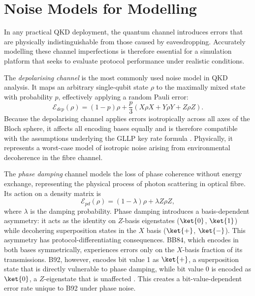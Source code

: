 
\section{Noise Models for Modelling}

In any practical QKD deployment, the quantum channel introduces errors that are physically indistinguishable from those caused by eavesdropping. Accurately modelling these channel imperfections is therefore essential for a simulation platform that seeks to evaluate protocol performance under realistic conditions.

The \textit{depolarising channel} is the most commonly used noise model in QKD analysis. It maps an arbitrary single-qubit state $\rho$ to the maximally mixed state with probability $p$, effectively applying a random Pauli error:
%
\begin{equation}
\label{eq:depolarising}
\mathcal{E}_{dep}(\rho) = (1-p)\rho + \frac{p}{3}(X\rho X + Y\rho Y + Z\rho Z).
\end{equation}
%
Because the depolarising channel applies errors isotropically across all axes of the Bloch sphere, it affects all encoding bases equally and is therefore compatible with the assumptions underlying the GLLP key rate formula \cite{GLLP2004}. Physically, it represents a worst-case model of isotropic noise arising from environmental decoherence in the fibre channel.

The \textit{phase damping} channel models the loss of phase coherence without energy exchange, representing the physical process of photon scattering in optical fibre. Its action on a density matrix is
%
\begin{equation}
\label{eq:phase-damping}
\mathcal{E}_{pd}(\rho) = (1-\lambda)\rho + \lambda Z\rho Z,
\end{equation}
%
where $\lambda$ is the damping probability. Phase damping introduces a basis-dependent asymmetry: it acts as the identity on $Z$-basis eigenstates ($\ket{0}$, $\ket{1}$) while decohering superposition states in the $X$ basis ($\ket{+}$, $\ket{-}$). This asymmetry has protocol-differentiating consequences. BB84, which encodes in both bases symmetrically, experiences errors only on the $X$-basis fraction of its transmissions. B92, however, encodes bit value 1 as $\ket{+}$, a superposition state that is directly vulnerable to phase damping, while bit value 0 is encoded as $\ket{0}$, a $Z$-eigenstate that is unaffected \cite{QKDbible}. This creates a bit-value-dependent error rate unique to B92 under phase noise.

